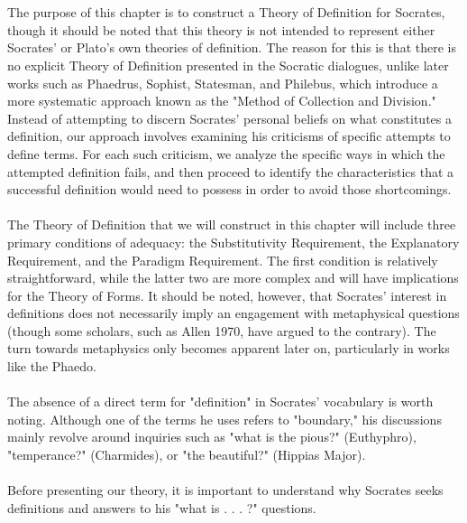 \\
\\
The purpose of this chapter is to construct a Theory of Definition for Socrates, though it should be noted that this theory is not intended to represent either Socrates' or Plato's own theories of definition. The reason for this is that there is no explicit Theory of Definition presented in the Socratic dialogues, unlike later works such as Phaedrus, Sophist, Statesman, and Philebus, which introduce a more systematic approach known as the "Method of Collection and Division." Instead of attempting to discern Socrates' personal beliefs on what constitutes a definition, our approach involves examining his criticisms of specific attempts to define terms. For each such criticism, we analyze the specific ways in which the attempted definition fails, and then proceed to identify the characteristics that a successful definition would need to possess in order to avoid those shortcomings.
\\
\\
The Theory of Definition that we will construct in this chapter will include three primary conditions of adequacy: the Substitutivity Requirement, the Explanatory Requirement, and the Paradigm Requirement. The first condition is relatively straightforward, while the latter two are more complex and will have implications for the Theory of Forms. It should be noted, however, that Socrates' interest in definitions does not necessarily imply an engagement with metaphysical questions (though some scholars, such as Allen 1970, have argued to the contrary). The turn towards metaphysics only becomes apparent later on, particularly in works like the Phaedo.
\\
\\
The absence of a direct term for "definition" in Socrates' vocabulary is worth noting. Although one of the terms he uses refers to "boundary," his discussions mainly revolve around inquiries such as "what is the pious?" (Euthyphro), "temperance?" (Charmides), or "the beautiful?" (Hippias Major).
\\
\\
Before presenting our theory, it is important to understand why Socrates seeks definitions and answers to his "what is . . . ?" questions.
\\
\\
